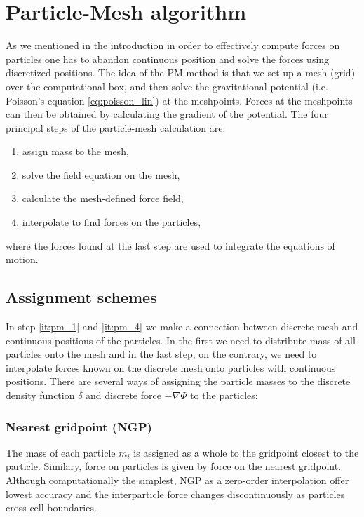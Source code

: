 \section{Particle-Mesh algorithm}
\label{sec:PM}
As we mentioned in the introduction in order to effectively compute forces on particles one has to abandon continuous position and solve the forces using discretized positions. The idea of the PM method is that we set up a mesh (grid) over the computational box, and then solve the gravitational potential (i.e. Poisson’s equation \eqref{eq:poisson_lin}) at the meshpoints. Forces at the meshpoints can then be obtained by calculating the gradient of the potential. The four principal steps of the particle-mesh calculation are:
\begin{enumerate}
    \item assign mass to the mesh,
    \label{it:pm_1}
    \item solve the field equation on the mesh,
    \label{it:pm_2}
    \item calculate the mesh-defined force field,
    \label{it:pm_3}
    \item interpolate to find forces on the particles,
    \label{it:pm_4}
\end{enumerate}
where the forces found at the last step are used to integrate the equations of motion.
\subsection{Assignment schemes}
In step \ref{it:pm_1} and \ref{it:pm_4} we make a connection between discrete mesh and continuous positions of the particles. In the first we need to distribute mass of all particles onto the mesh and in the last step, on the contrary, we need to interpolate forces known on the discrete mesh onto particles with continuous positions. There are several ways of assigning the particle masses to the discrete density function $\delta$ and discrete force $-\nabla\Phi$ to the particles:

\subsubsection{Nearest gridpoint (NGP)}
The mass of each particle $m_i$ is assigned as a whole to the gridpoint closest to the particle. Similary, force on particles is given by force on the nearest gridpoint. Although computationally the simplest, NGP as a zero-order interpolation offer lowest accuracy and the interparticle force changes discontinuously as particles cross cell boundaries.

